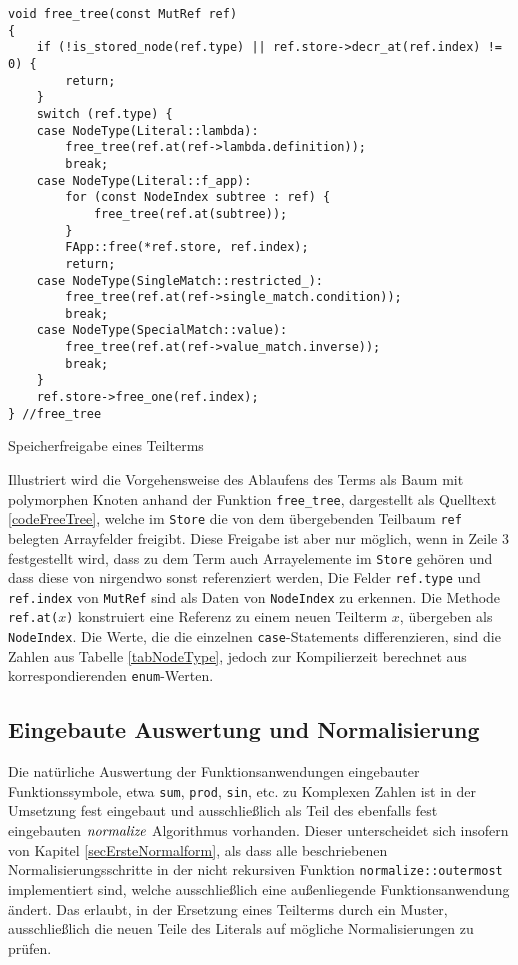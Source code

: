 \begin{listing}
\footnotesize
\begin{verbatim}
void free_tree(const MutRef ref)
{
    if (!is_stored_node(ref.type) || ref.store->decr_at(ref.index) != 0) { 
        return; 
    }
    switch (ref.type) {
    case NodeType(Literal::lambda):
        free_tree(ref.at(ref->lambda.definition));
        break;
    case NodeType(Literal::f_app):
        for (const NodeIndex subtree : ref) {
            free_tree(ref.at(subtree));
        }
        FApp::free(*ref.store, ref.index);
        return;
    case NodeType(SingleMatch::restricted_):
        free_tree(ref.at(ref->single_match.condition));
        break;
    case NodeType(SpecialMatch::value):
        free_tree(ref.at(ref->value_match.inverse));
        break;
    }
    ref.store->free_one(ref.index);
} //free_tree
\end{verbatim}
\caption{Speicherfreigabe eines Teilterms}
\label{codeFreeTree}
\end{listing}

Illustriert wird die Vorgehensweise des Ablaufens des Terms als Baum mit polymorphen Knoten anhand der Funktion \verb|free_tree|, dargestellt als Quelltext \ref{codeFreeTree}, welche im \verb|Store| die von dem übergebenden Teilbaum \verb|ref| belegten Arrayfelder freigibt. Diese Freigabe ist aber nur möglich, wenn in Zeile 3 festgestellt wird, dass zu dem Term auch Arrayelemente im \verb|Store| gehören und dass diese von nirgendwo sonst referenziert werden,
 Die Felder \verb|ref.type| und \verb|ref.index| von \verb|MutRef| sind als Daten von \verb|NodeIndex| zu erkennen. Die Methode \verb|ref.at(|$x$\verb|)| konstruiert eine Referenz zu einem neuen Teilterm $x$, übergeben als \verb|NodeIndex|.
Die Werte, die die einzelnen \verb|case|-Statements differenzieren, sind die Zahlen aus Tabelle \ref{tabNodeType}, jedoch zur Kompilierzeit berechnet aus korrespondierenden \verb|enum|-Werten.

\subsection{Eingebaute Auswertung und Normalisierung} \label{subsubsecAuswertungNormalCpp}

Die \glqq natürliche\grqq{} Auswertung der Funktionsanwendungen eingebauter Funktionssymbole, etwa \verb|sum|, \verb|prod|, \verb|sin|, etc. zu Komplexen Zahlen ist in der Umsetzung fest eingebaut und ausschließlich als Teil des ebenfalls fest eingebauten $\mathit{normalize}$ Algorithmus vorhanden. Dieser unterscheidet sich insofern von Kapitel \ref{secErsteNormalform}, als dass alle beschriebenen Normalisierungsschritte in der nicht rekursiven Funktion \verb|normalize::outermost| implementiert sind, welche ausschließlich eine außenliegende Funktionsanwendung ändert. Das erlaubt, in der Ersetzung eines Teilterms durch ein Muster, ausschließlich die neuen Teile des Literals auf mögliche Normalisierungen zu prüfen.

